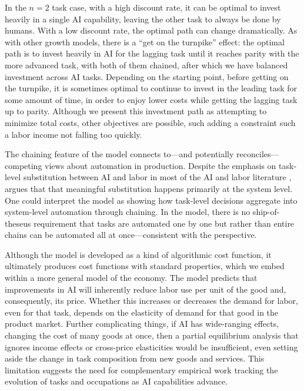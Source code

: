\documentclass{article}
\theoremstyle{plain}
\theoremstyle{plain}
\begin{document}
In the $n = 2$ task case, with a high discount rate, it can be optimal to invest heavily in a single AI capability, leaving the other task to always be done by humans.
With a low discount rate, the optimal path can change dramatically. 
As with other growth models, there is a ``get on the turnpike'' effect: the optimal path is to invest heavily in AI for the lagging task until it reaches parity with the more advanced task, with both of them chained, after which we have balanced investment across AI tasks.
Depending on the starting point, before getting on the turnpike, it is sometimes optimal to continue to invest in the leading task for some amount of time, in order to enjoy lower costs while getting the lagging task up to parity.
Although we present this investment path as attempting to minimize total costs, other objectives are possible, such adding a constraint such a labor income not falling too quickly.

The chaining feature of the model connects to---and potentially reconciles---competing views about automation in production. 
Despite the emphasis on task-level substitution between AI and labor in most of the AI and labor literature \citep{autor2003skill, acemoglu2018automation}, \cite{bresnahan2002information} argues that that meaningful substitution happens primarily at the system level. 
One could interpret the model as showing how task-level decisions aggregate into system-level automation through chaining.
In the model, there is no ship-of-theseus requirement that tasks are automated one by one but rather than entire chains can be automated all at once---consistent with the \cite{bresnahan2002information} perspective.

Although the model is developed as a kind of algorithmic cost function, it ultimately produces cost functions with standard properties, which we embed within a more general model of the economy.  
The model predicts that improvements in AI will inherently reduce labor use per unit of the good and, consequently, its price.  
Whether this increases or decreases the demand for labor, even for that task, depends on the elasticity of demand for that good in the product market.  
Further complicating things, if AI has wide-ranging effects, changing the cost of many goods at once, then a partial equilibrium analysis that ignores income effects or cross-price elasticities would be insufficient, even setting aside the change in task composition from new goods and services.
This limitation suggests the need for complementary empirical work tracking the evolution of tasks and occupations as AI capabilities advance.
\end{document}
